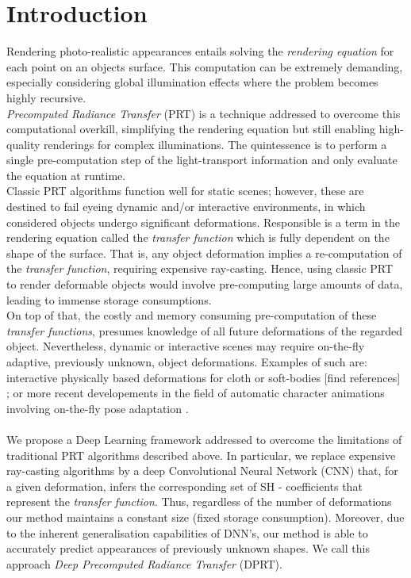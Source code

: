 \section{Introduction}

Rendering photo-realistic appearances entails solving the \textit{rendering equation} for each point on an objects surface. This computation can be extremely demanding, especially considering global illumination effects where the problem becomes highly recursive. \\
\textit{Precomputed Radiance Transfer} (PRT) is a technique addressed to overcome this computational overkill, simplifying the rendering equation but still enabling high-quality renderings for complex illuminations. The quintessence is to perform a single pre-computation step of the light-transport information and only evaluate the equation at runtime.\\
Classic PRT algorithms function well for static scenes; however, these are destined to fail eyeing dynamic and/or interactive environments, in which considered objects undergo significant deformations.
Responsible is a term in the rendering equation called the \textit{transfer function} which is fully dependent on the shape of the surface. That is, any object deformation implies a re-computation of the \textit{transfer function},  requiring expensive ray-casting. Hence, using classic PRT to render deformable objects would involve pre-computing large amounts of data, leading to immense storage consumptions. \\
On top of that, the costly and memory consuming pre-computation of these \textit{transfer functions}, presumes knowledge of all future deformations of the regarded object. Nevertheless, dynamic or interactive scenes may require on-the-fly adaptive, previously unknown, object deformations. Examples of such are: 
interactive physically based deformations for cloth or soft-bodies [find references] ; 
or more recent developements in the field of automatic character animations involving on-the-fly pose adaptation \cite{DeepHuman,Holden2017, QuadrupedMotion}. \\
\\
We propose a Deep Learning framework addressed to overcome the limitations of traditional PRT algorithms described above. In particular, we replace expensive ray-casting algorithms by a deep Convolutional Neural Network (CNN) that, for a given deformation, infers the corresponding set of SH - coefficients that represent the \textit{transfer function}. 
Thus, regardless of the number of deformations our method maintains a constant size (fixed storage consumption). Moreover, due to the inherent generalisation capabilities of DNN's, our method is able to accurately predict appearances of previously unknown shapes. We call this approach \textit{Deep Precomputed Radiance Transfer} (DPRT). \\

